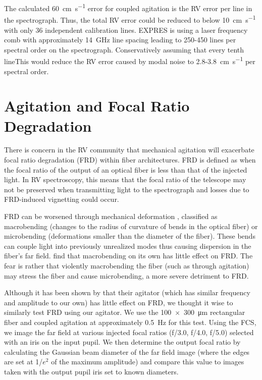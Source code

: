 \documentclass[twocolumn]{emulateapj}
\begin{document}
The calculated \SI{60}{\centi\meter\per\second} error for coupled agitation is the RV error per line in the spectrograph. Thus, the total RV error could be reduced to below \SI{10}{\centi\meter\per\second} with only 36 independent calibration lines. EXPRES is using a laser frequency comb with approximately \SI{14}{\giga\hertz} line spacing leading to 250-450 lines per spectral order on the spectrograph. Conservatively assuming that every tenth lineThis would reduce the RV error caused by modal noise to 2.8-\SI{3.8}{\centi\meter\per\second} per spectral order.

\section{Agitation and Focal Ratio Degradation}
\label{sec:frd}

There is concern in the RV community that mechanical agitation will exacerbate focal ratio degradation (FRD) within fiber architectures. FRD is defined as when the focal ratio of the output of an optical fiber is less than that of the injected light. In RV spectroscopy, this means that the focal ratio of the telescope may not be preserved when transmitting light to the spectrograph and losses due to FRD-induced vignetting could occur.

FRD can be worsened through mechanical deformation \citet{Ramsey1988}, classified as macrobending (changes to the radius of curvature of bends in the optical fiber) or microbending (deformations smaller than the diameter of the fiber). These bends can couple light into previously unrealized modes thus causing dispersion in the fiber's far field. \citet{Powell1984, Engelsrath1986, Ramsey1988} find that macrobending on its own has little effect on FRD. The fear is rather that violently macrobending the fiber (such as through agitation) may stress the fiber and cause microbending, a more severe detriment to FRD.

Although it has been shown by \citet{Sablowski2015} that their agitator (which has similar frequency and amplitude to our own) has little effect on FRD, we thought it wise to similarly test FRD using our agitator. We use the \SI{100x300}{\micro\meter} rectangular fiber and coupled agitation at approximately \SI{0.5}{\hertz} for this test. Using the FCS, we image the far field at various injected focal ratios (f/3.0, f/4.0, f/5.0) selected with an iris on the input pupil. We then determine the output focal ratio by calculating the Gaussian beam diameter of the far field image (where the edges are set at 1/${e^2}$ of the maximum amplitude) and compare this value to images taken with the output pupil iris set to known diameters.
\end{document}
